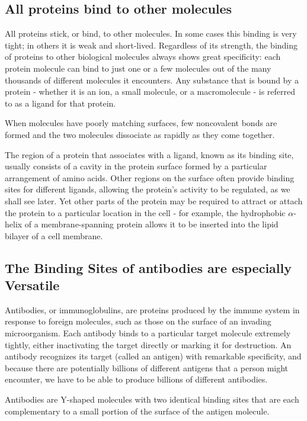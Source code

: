 \subsection{All proteins bind to other molecules}

All proteins stick, or bind, to other molecules. In some cases this binding is
very tight; in others it is weak and short-lived.
Regardless of its strength, the binding
of proteins to other biological molecules always shows great specificity:
each protein molecule can bind to just one or a few molecules out of
the many thousands of different molecules it encounters. Any substance
that is bound by a protein - whether it is an ion, a small molecule, or a
macromolecule - is referred to as a ligand for that protein.

When molecules have poorly matching surfaces, few noncovalent bonds
are formed and the two molecules dissociate as rapidly as they come
together.

The region of a protein that associates with a ligand, known as its binding site, 
usually consists of a cavity in the protein surface formed by a
particular arrangement of amino acids. Other regions on the surface often provide 
binding sites for different ligands, allowing the protein’s
activity to be regulated, as we shall see later. Yet other parts of the protein
may be required to attract or attach the protein to a particular location in
the cell - for example, the hydrophobic $\alpha$-helix of a membrane-spanning
protein allows it to be inserted into the lipid bilayer of a cell membrane.

\subsection{The Binding Sites of antibodies are especially Versatile}

Antibodies, or immunoglobulins, are proteins produced by the immune
system in response to foreign molecules, such as those on the surface
of an invading microorganism. Each antibody binds to a particular target 
molecule extremely tightly, either inactivating the target directly or
marking it for destruction. An antibody recognizes its target (called an
antigen) with remarkable specificity, and because there are potentially
billions of different antigens that a person might encounter, we have to
be able to produce billions of different antibodies.

Antibodies are Y-shaped molecules with two identical binding sites that
are each complementary to a small portion of the surface of the antigen
molecule.

